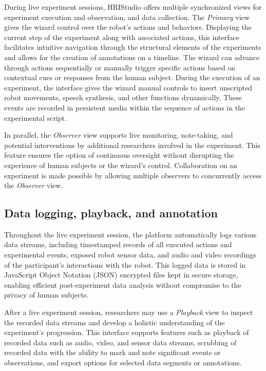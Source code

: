 \documentclass[letterpaper, 10 pt, conference]{ieeeconf}
\begin{document}
During live experiment sessions, HRIStudio offers multiple synchronized views for experiment execution and observation, and data collection. The \emph{Primary} view gives the wizard control over the robot's actions and behaviors. Displaying the current step of the experiment along with associated actions, this interface facilitates intuitive navigation through the structural elements of the experiments and allows for the creation of annotations on a timeline. The wizard can advance through actions sequentially or manually trigger specific actions based on contextual cues or responses from the human subject. During the execution of an experiment, the interface gives the wizard manual controls to insert unscripted robot movements, speech synthesis, and other functions dynamically. These events are recorded in persistent media within the sequence of actions in the experimental script.

In parallel, the \emph{Observer} view supports live monitoring, note-taking, and potential interventions by additional researchers involved in the experiment. This feature ensures the option of continuous oversight without disrupting the experience of human subjects or the wizard's control. Collaboration on an experiment is made possible by allowing multiple observers to concurrently access the \emph{Observer} view.

\subsection{Data logging, playback, and annotation}

Throughout the live experiment session, the platform automatically logs various data streams, including timestamped records of all executed actions and experimental events, exposed robot sensor data, and audio and video recordings of the participant's interactions with the robot. This logged data is stored in JavaScript Object Notation (JSON)  encrypted files kept in secure storage, enabling efficient post-experiment data analysis without compromise to the privacy of human subjects.

After a live experiment session, researchers may use a \emph{Playback} view to inspect the recorded data streams and develop a holistic understanding of the experiment's progression. This interface supports features such as playback of recorded data such as audio, video, and sensor data streams, scrubbing of recorded data with the ability to mark and note significant events or observations, and export options for selected data segments or annotations.
\end{document}
